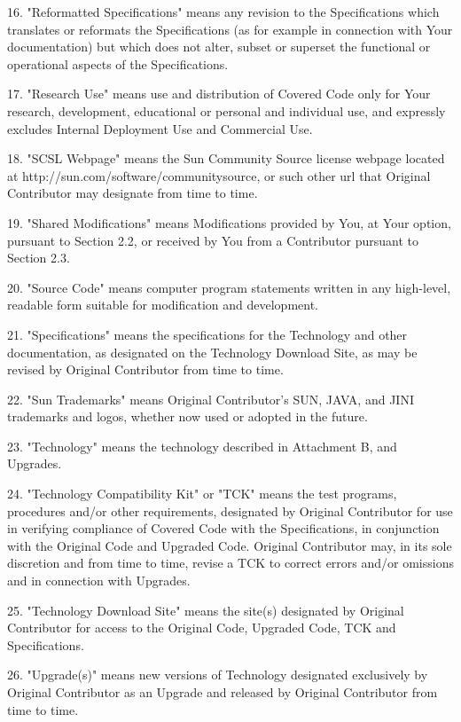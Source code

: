 {16.  "Reformatted Specifications" means any revision to the
Specifications which translates or reformats the Specifications (as
for example in connection with Your documentation) but which does not
alter, subset or superset the functional or operational aspects of the
Specifications.

17.  "Research Use" means use and distribution of Covered Code only
for Your research, development, educational or personal and individual
use, and expressly excludes Internal Deployment Use and Commercial
Use.

18.  "SCSL Webpage" means the Sun Community Source license webpage
located at http://sun.com/software/communitysource, or such other url
that Original Contributor may designate from time to time.

19.  "Shared Modifications" means Modifications provided by You, at
Your option, pursuant to Section 2.2, or received by You from a
Contributor pursuant to Section 2.3.

20.  "Source Code" means computer program statements written in any
high-level, readable form suitable for modification and development.

21.  "Specifications" means the specifications for the Technology and
other documentation, as designated on the Technology Download Site, as
may be revised by Original Contributor from time to time.

22.  "Sun Trademarks" means Original Contributor's SUN, JAVA, and JINI
trademarks and logos, whether now used or adopted in the future.

23.  "Technology" means the technology described in Attachment B, and
Upgrades.

24.  "Technology Compatibility Kit" or "TCK" means the test programs,
procedures and/or other requirements, designated by Original
Contributor for use in verifying compliance of Covered Code with the
Specifications, in conjunction with the Original Code and Upgraded
Code.  Original Contributor may, in its sole discretion and from time
to time, revise a TCK to correct errors and/or omissions and in
connection with Upgrades.

25.  "Technology Download Site" means the site(s) designated by
Original Contributor for access to the Original Code, Upgraded Code,
TCK and Specifications.

26.  "Upgrade(s)" means new versions of Technology designated
exclusively by Original Contributor as an Upgrade and released by
Original Contributor from time to time.

}
